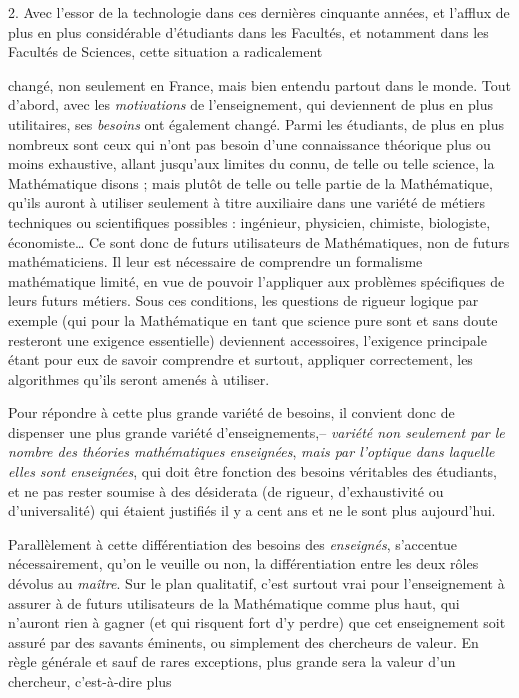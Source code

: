 \documentclass[11pt,a4paper]{article}
\begin{document}
2. Avec l'essor de la technologie dans ces dernières cinquante années, et
l'afflux de plus en plus considérable d'étudiants dans les Facultés, et
notamment dans les Facultés de Sciences, cette situation a radicalement

changé, non seulement en France, mais bien entendu partout dans le monde.
Tout d'abord, avec les \emph{motivations} de l'enseignement, qui deviennent de
plus en plus utilitaires, ses \emph{besoins} ont également changé. Parmi les
étudiants, de plus en plus nombreux sont ceux qui n'ont pas besoin d'une
connaissance théorique plus ou moins exhaustive, allant jusqu'aux limites
du connu, de telle ou telle science, la Mathématique disons ; mais plutôt
de telle ou telle partie de la Mathématique, qu'ils auront à utiliser
seulement à titre auxiliaire dans une variété de métiers techniques ou
scientifiques possibles : ingénieur, physicien, chimiste, biologiste, économiste…
Ce sont donc de futurs utilisateurs de Mathématiques, non de futurs
mathématiciens. Il leur est nécessaire de comprendre un formalisme mathématique
limité, en vue de pouvoir l'appliquer aux problèmes spécifiques de leurs
futurs métiers. Sous ces conditions, les questions de rigueur logique par
exemple (qui pour la Mathématique en tant que science pure sont et sans
doute resteront une exigence essentielle) deviennent accessoires, l'exigence
principale étant pour eux de savoir comprendre et surtout, appliquer
correctement, les algorithmes qu'ils seront amenés à utiliser.

Pour répondre à cette plus grande variété de besoins, il convient
donc de dispenser une plus grande variété d'enseignements,-- \emph{variété non
seulement par le nombre des théories mathématiques enseignées}, \emph{mais par l'optique
dans laquelle elles sont enseignées}, qui doit être fonction des besoins
véritables des étudiants, et ne pas rester soumise à des désiderata (de
rigueur, d'exhaustivité ou d'universalité) qui étaient justifiés il y a
cent ans et ne le sont plus aujourd'hui.

Parallèlement à cette différentiation des besoins des \emph{enseignés},
s'accentue nécessairement, qu'on le veuille ou non, la différentiation
entre les deux rôles dévolus au \emph{maître}. Sur le plan qualitatif, c'est
surtout vrai pour l'enseignement à assurer à de futurs utilisateurs de la
Mathématique comme plus haut, qui n'auront rien à gagner (et qui risquent
fort d'y perdre) que cet enseignement soit assuré par des savants éminents,
ou simplement des chercheurs de valeur. En règle générale et sauf de rares
exceptions, plus grande sera la valeur d'un chercheur, c'est-à-dire plus
\end{document}
